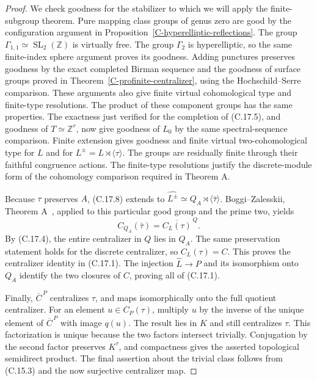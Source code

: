 \begin{proof}
We check goodness for the stabilizer to which we will apply
the finite-subgroup theorem. Pure mapping class groups of
genus zero are good by the configuration argument in
Proposition~\ref{C-hyperelliptic-reflections}. The group
$\Gamma_{1,1}\simeq\operatorname{SL}_2(\mathbb Z)$ is
virtually free. The group $\Gamma_2$ is hyperelliptic, so
the same finite-index sphere argument proves its goodness.
Adding punctures preserves goodness by the exact completed
Birman sequence and the goodness of surface groups proved
in Theorem~\ref{C-profinite-centralizer}, using the
Hochschild--Serre comparison. These arguments also give
finite virtual cohomological type and finite-type resolutions.
The product of these component groups has the same
properties. The exactness just verified for the completion
of (C.17.5), and goodness of $T\simeq\mathbb Z^r$, now give
goodness of $L_0$ by the same spectral-sequence comparison.
Finite extension gives goodness and finite virtual
two-cohomological type for $L$ and for
$L^{\pm}=L\rtimes\langle\tau\rangle$. The groups are
residually finite through their faithful congruence actions.
The finite-type resolutions justify the discrete-module
form of the cohomology comparison required in Theorem A.

Because $\tau$ preserves $A$, (C.17.8) extends to
$\widehat{L^{\pm}}\simeq Q_A\rtimes\langle\bar\tau\rangle$.
Boggi--Zalesskii, Theorem A~\cite{BoggiZalesskii2024}, applied
to this particular good group and the prime two, yields
\[
 C_{Q_A}(\bar\tau)=\overline{C_L(\tau)}^{\,Q}.
\]
By (C.17.4), the entire centralizer in $Q$ lies in $Q_A$.
The same preservation statement holds for the discrete
centralizer, so $C_L(\tau)=C$. This proves the centralizer
identity in (C.17.1). The injection $\widehat L\to P$ and
its isomorphism onto $Q_A$ identify the two closures of
$C$, proving all of (C.17.1).

Finally, $\overline C^{\,P}$ centralizes $\tau$, and maps
isomorphically onto the full quotient centralizer. For an
element $u\in C_P(\tau)$, multiply $u$ by the inverse of
the unique element of $\overline C^{\,P}$ with image $q(u)$.
The result lies in $K$ and still centralizes $\tau$.
This factorization is unique because the two factors
intersect trivially. Conjugation by the second factor
preserves $K^\tau$, and compactness gives the asserted
topological semidirect product. The final assertion about
the trivial class follows from (C.15.3) and the now
surjective centralizer map.
\end{proof}

